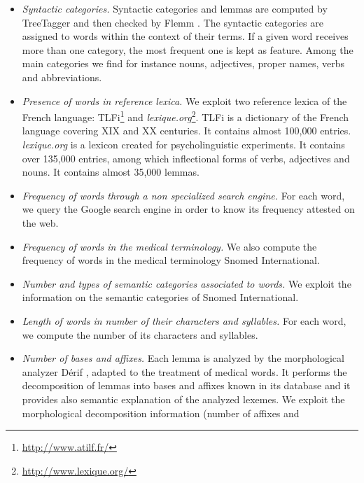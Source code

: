 
\begin{itemize}
\item {\it Syntactic categories.}  Syntactic categories and lemmas are
  computed by TreeTagger \citep{Schmid-1994} and then checked
   by Flemm
  \citep{Namer-TAL2000}.  The syntactic categories are assigned to
  words within the context of their terms.  If a given word receives
  more than one category, the most frequent one is kept as feature.
  Among the main categories we find for instance nouns, adjectives,
  proper names, verbs and abbreviations.
\item {\it Presence of words in reference lexica.} We exploit two
  reference lexica of the French language:
  TLFi\footnote{\url{http://www.atilf.fr/}} and {\it lexique.org}\footnote{\url{http://www.lexique.org/}}. TLFi is
  a dictionary of the French language covering XIX and XX
  centuries. It contains almost 100,000 entries. {\it lexique.org} is
  a lexicon created for psycholinguistic experiments. It contains over
  135,000 entries, among which inflectional forms of verbs, adjectives
  and nouns. It contains almost 35,000 lemmas.
\item {\it Frequency of words through a non specialized search
    engine.} For each word, we query the Google search engine in order
  to know its frequency attested on the web.
\item {\it Frequency of words in the medical terminology.} We also
  compute the frequency of words in the medical terminology Snomed
  International.
\item {\it Number and types of semantic categories associated to
    words.} We exploit the information on the semantic categories of
  Snomed International.
\item {\it Length of words in number of their characters and
    syllables.} For each word, we compute the number of its characters
  and syllables.
\item {\it Number of bases and affixes.} Each lemma is analyzed by the
  morphological analyzer D\'erif \citep{Namer-AMIA2004}, adapted to the
  treatment of medical words. It performs the decomposition of lemmas
  into bases and affixes known in its database and it provides also
  semantic explanation of the analyzed lexemes. We exploit the
  morphological decomposition information (number of affixes and

\end{itemize}
